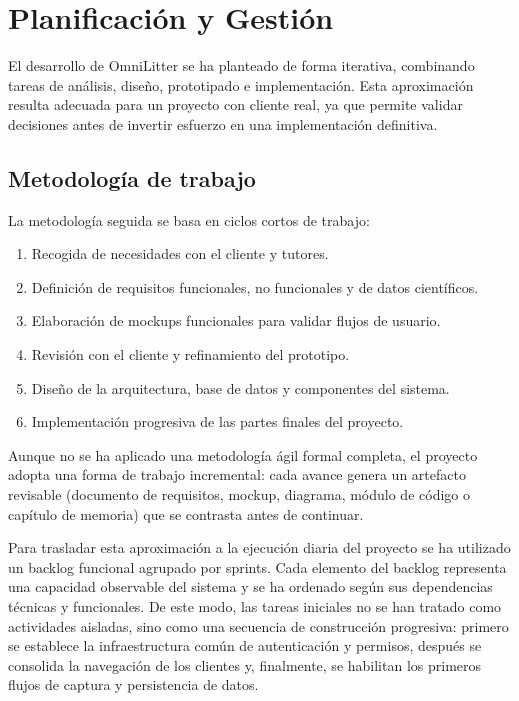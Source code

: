 
\section{Planificación y Gestión}
\label{sec:planificacion_gestion}


El desarrollo de OmniLitter se ha planteado de forma iterativa, combinando tareas
de análisis, diseño, prototipado e implementación. Esta aproximación resulta
adecuada para un proyecto con cliente real, ya que permite validar decisiones antes
de invertir esfuerzo en una implementación definitiva.

\subsection{Metodología de trabajo}

La metodología seguida se basa en ciclos cortos de trabajo:

\begin{enumerate}
  \item Recogida de necesidades con el cliente y tutores.
  \item Definición de requisitos funcionales, no funcionales y de datos científicos.
  \item Elaboración de mockups funcionales para validar flujos de usuario.
  \item Revisión con el cliente y refinamiento del prototipo.
  \item Diseño de la arquitectura, base de datos y componentes del sistema.
  \item Implementación progresiva de las partes finales del proyecto.
\end{enumerate}

Aunque no se ha aplicado una metodología ágil formal completa, el proyecto adopta
una forma de trabajo incremental: cada avance genera un artefacto revisable
(documento de requisitos, mockup, diagrama, módulo de código o capítulo de memoria)
que se contrasta antes de continuar.

Para trasladar esta aproximación a la ejecución diaria del proyecto se ha utilizado
un backlog funcional agrupado por sprints. Cada elemento del backlog representa una
capacidad observable del sistema y se ha ordenado según sus dependencias técnicas y
funcionales. De este modo, las tareas iniciales no se han tratado como actividades
aisladas, sino como una secuencia de construcción progresiva: primero se establece
la infraestructura común de autenticación y permisos, después se consolida la
navegación de los clientes y, finalmente, se habilitan los primeros flujos de
captura y persistencia de datos.

